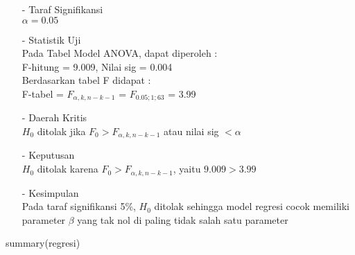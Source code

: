 \begin{enumerate}
\begin{test}
{\begin{enumerate}
    \item[-] Taraf Signifikansi \\
    $\alpha = 0.05$

    \item[-] Statistik Uji \\
    Pada Tabel Model ANOVA, dapat diperoleh : \\
    F-hitung = 9.009, Nilai sig = 0.004 \\
    Berdasarkan tabel F didapat : \\
    F-tabel = $F_{\alpha, k, n-k-1}$ = $F_{0.05; 1; 63}$ = 3.99

    \item[-] Daerah Kritis \\
    $H_0$ ditolak jika $F_0 > F_{\alpha, k, n-k-1}$ atau nilai sig $< \alpha$

    \item[-] Keputusan \\
    $H_0$ ditolak karena $F_0 > F_{\alpha, k, n-k-1}$, yaitu $9.009 > 3.99$

    \item[-] Kesimpulan \\
    Pada taraf signifikansi 5\%, $H_0$ ditolak sehingga model regresi cocok memiliki parameter $\beta$ yang tak nol di paling tidak salah satu parameter
\end{enumerate}
}
summary(regresi)
\end{test}


\end{enumerate}
